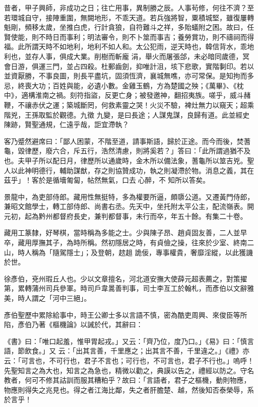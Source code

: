 \begin{pinyinscope}
 昔者，甲子興師，非成功之日；往亡用事，異制勝之辰。人事茍修，何往不濟？至若環城自守，接陣重圍，無闕地形，不乖天道。若兵強將智，粟積城堅，雖復屢轉魁剛，頻移太歲，坐推白虎，行計貪狼，自符難斗之祥，多貽蟻附之困。故曰，任賢使能，則不時日而事利；明法審令，則不卜筮而事吉；養勞賞功，則不禱祠而得福。此所謂天時不如地利，地利不如人和。太公犯雨，逆天時也，韓信背水，乖地利也，並存人事，俱成大業。削樹而斬龐
 涓，舉火而屠張郃，未必暗同歲德，冥會日游，俱運三門，並占四殺。杜郵齒劍，抑唯計沮，垓下悲歌，實階剚印。若以並資厭勝，不事良圖，則長平盡坑，固須恆濟，襄城無噍，亦可常保。是知拘而多忌，終喪大功；百姓與能，必遺小數。金雞玉鶴，方為楚國之殃；《萬畢》、《枕中》，適構淮南之禍。刻符指盜，反更亡身；被發邀神，翻招夷族。嗟乎，威斗赭鞭，不禳赤伏之運；築城斷罔，何救素靈之哭！火災不驗，裨灶無力以窺天；超乘階兇，王孫取監於觀德。九徵
 九變，是曰長途；人謀鬼謀，良歸有道。此並經史陳跡，賢聖通規，仁遠乎哉，詎宜滯執？



 客乃蹙然避席曰：「鄙人困蒙，不階至道，請事斯語，歸於正途。而今而後，焚蓍龜，毀律歷，廢六合，斥五行，浩然清慮，則將奚若？」答曰：「此所謂過猶不及也。夫甲子所以配日月，律歷所以通歲時，金木所以備法象，蓍龜所以筮吉兇。聖人以此神明德行，輔助謀猷，存之則協贊成功，執之則凝滯於物。消息之義，其在茲乎」！客於是循墻匍匐，帖然無氣，口去心醉，不
 知所以答矣。



 景龍中，為吏部侍郎。藏用性無挺特，多為權要所逼，頗隳公道。又遷黃門侍郎，兼昭文館學士，轉工部侍郎、尚書右丞。先天中，坐托附太平公主，配流嶺表。開元初，起為黔州都督府長史，兼判都督事，未行而卒，年五十餘。有集二十卷。



 藏用工篆隸，好琴棋，當時稱為多能之士。少與陳子昂、趙貞固友善，二人並早卒，藏用厚撫其子，為時所稱。然初隱居之時，有貞儉之操，往來於少室、終南二山，時人稱為「隨駕隱士」；及登朝，趑趄
 詭佞，專事權貴，奢靡淫縱，以此獲譏於世。



 徐彥伯，兗州瑕丘人也。少以文章擅名，河北道安撫大使薛元超表薦之，對策擢第，累轉蒲州司兵參軍。時司戶韋暠善判事，司士李亙工於翰札，而彥伯以文辭雅美，時人謂之「河中三絕」。



 彥伯聖歷中累除給事中，時王公卿士多以言語不慎，密為酷吏周興、來俊臣等所陷，彥伯乃著《樞機論》以誡於代，其辭曰：



 《書》曰：「唯口起羞，惟甲胃起戎。」又云：「齊乃位，度乃口。」《易》曰：「慎言語，節飲食。」又
 云：「出其言善，千里應之；出其言不善，千里違之。」《禮》亦云：「可言也，不可行也，君子不言也；可行也，不可言也，君子不行也。」嗚呼！先聖知言之為大也，知言之為急也，精微以勸之，典謨以告之，禮經以防之。守名教者，何可不修其詁訓而服其糟粕乎？故曰：「言語者，君子之樞機，動則物應，物應則得失之兆見也。得之者江海比鄰，失之者肝膽楚、越，然後知否泰榮辱，系於言乎！




\end{pinyinscope}
